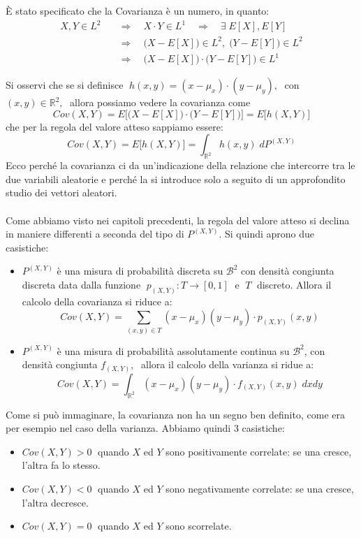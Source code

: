 È stato specificato che la Covarianza è un numero, in quanto: 
\begin{align*}
    X, Y\in L^2 &\quad \Rightarrow \quad X\cdot Y \in L^1 \quad \Rightarrow \quad\exists\;E[X], E[Y]\\
&\quad \Rightarrow \quad \bigl(X-E[X]\bigr) \in L^2, \;\bigl(Y-E[Y]\bigr)\in L^2\\
& \quad \Rightarrow \quad \bigl(X-E[X]\bigr)\cdot \bigl(Y-E[Y]\bigr)\in L^1
\end{align*}

\bigskip
\noindent Si osservi che se si definisce $\;h(x, y) = (x - \mu_x)\cdot (y-\mu_y),\;$ con $(x, y)\in\mathbb{R}^2, \;$ allora possiamo vedere la covarianza come
\[Cov(X, Y) = E\bigl[\bigl(X-E[X]\bigr)\cdot \bigl(Y-E[Y]\bigr)\bigr] = E\bigl[h(X, Y)\bigr]\]
che per la regola del valore atteso sappiamo essere:
\[Cov(X, Y) = E\bigl[h(X, Y)\bigr] = \int_{\mathbb{R}^2}h(x, y) \;dP^{(X, Y)}\]
Ecco perché la covarianza ci da un'indicazione della relazione che intercorre tra le due variabili aleatorie e perché la si introduce solo a seguito di un approfondito studio dei vettori aleatori.\\
\\
Come abbiamo visto nei capitoli precedenti, la regola del valore atteso si declina in maniere differenti a seconda del tipo di $P^{(X, Y)}$. Si quindi aprono due casistiche:

\begin{itemize}
    \item $P^{(X, Y)}$ è una misura di probabilità discreta su $\mathcal{B}^2$ con densità congiunta discreta  data dalla funzione $\;p_{(X, Y)}:T\to [0, 1]\;\text{ e }\; T\; $ discreto. Allora il calcolo della covarianza si riduce a:
    \[\boxed{Cov(X, Y) = \sum_{(x, y)\in T}(x-\mu_x)(y-\mu_y)\cdot p_{(X, Y)}(x, y)}\]
    \item $P^{(X, Y)}$ è una misura di probabilità assolutamente continua su $\mathcal{B}^2$, con densità congiunta $f_{(X, Y)},\;$ allora il calcolo della varianza si ridue a:
    \[\boxed{Cov(X, Y) = \int_{\mathbb{R}^2}(x-\mu_x)(y-\mu_y)\cdot f_{(X, Y)}(x, y)\;dxdy}\]
\end{itemize}

\bigskip
\noindent Come si può immaginare, la covarianza non ha un segno ben definito, come era per esempio nel caso della varianza. Abbiamo quindi 3 casistiche:
\begin{itemize}
    \item $Cov(X, Y)>0\;$ quando $X$ ed $Y$ sono positivamente correlate: se una cresce, l'altra fa lo stesso.
    \item $Cov(X, Y)<0\;$ quando $X$ ed $Y$ sono negativamente correlate: se una cresce, l'altra decresce.
    \item $Cov(X, Y)=0\;$ quando $X$ ed $Y$ sono scorrelate.
\end{itemize}

